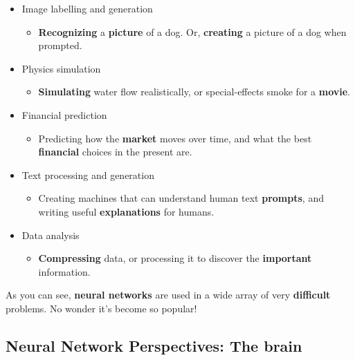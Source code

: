         \begin{itemize}
            \item Image labelling and generation
                \begin{itemize}
                    \item \miniex \textbf{Recognizing} a \textbf{picture} of a dog. Or, \textbf{creating} a picture of a dog when prompted.
                \end{itemize}
            \item Physics simulation
                \begin{itemize}
                    \item \miniex \textbf{Simulating} water flow realistically, or special-effects smoke for a \textbf{movie}.
                \end{itemize}
            \item Financial prediction
                \begin{itemize}
                    \item \miniex Predicting how the \textbf{market} moves over time, and what the best \textbf{financial} choices in the present are.
                \end{itemize}
            \item Text processing and generation
                \begin{itemize}
                    \item \miniex Creating machines that can understand human text \textbf{prompts}, and writing useful \textbf{explanations} for humans.
                \end{itemize}
            \item Data analysis
                \begin{itemize}
                    \item \miniex \textbf{Compressing} data, or processing it to discover the \textbf{important} information.
                \end{itemize}
        \end{itemize}
        
        As you can see, \textbf{neural networks} are used in a wide array of very \textbf{difficult} problems. No wonder it's become so popular!
        
    \subsection{Neural Network Perspectives: The brain}
    
